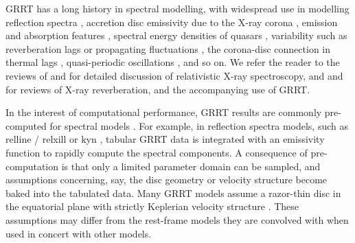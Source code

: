 \documentclass[fleqn,usenatbib]{mnras}
\newcommand{\software}[1]{{\sc #1}}
\begin{document}
GRRT has a long history in spectral modelling, with widespread use in modelling
reflection spectra \citep{fabian_x-ray_1989}, accretion disc emissivity
due to the X-ray corona \citep[e.g.][]{wilkins_understanding_2012,
wilkins_towards_2016}, emission and absorption features
\citep[e.g.][]{ruszkowski_absorption_2002}, spectral energy densities of quasars
\citep[e.g.][]{hagen_estimating_2023}, variability such as reverberation lags or
propagating fluctuations
\citep[e.g.][]{ingram_public_2019}, the corona-disc connection in thermal lags
\citep[e.g.][]{kammoun_hard_2019}, quasi-periodic oscillations \citep[QPOs,
e.g.][]{tsang_iron_2013}, and so on.  We refer the reader to the reviews of
\citet{reynolds_iron_lines_2003} and \citet{reynolds_observational_2021} for
detailed discussion of relativistic X-ray spectroscopy, and
\citet{uttley_x-ray_2014} and \citet{cackett_reverberation_2021} for reviews of
X-ray reverberation, and the accompanying use of GRRT.

In the interest of computational performance, GRRT results are commonly
pre-computed for spectral models \citep{laor_line_1991}. For example, in
reflection spectra models, such as \software{relline} / \software{relxill}
\citep{dauser_broad_2010, dauser_relativistic_2016} or \software{kyn}
\citep{dovciak_extended_2004}, tabular GRRT data is integrated with an emissivity function to rapidly
compute the spectral components. A consequence of pre-computation is that only a
limited parameter domain can be sampled, and assumptions concerning, say, the
disc geometry or velocity structure become baked into the tabulated data. Many
GRRT models assume a razor-thin disc in the equatorial plane with strictly
Keplerian velocity structure \citep[e.g.][]{dovciak_extended_2004,
beckwith_iron_2004, brenneman_constraining_2006, dauser_broad_2010}. These
assumptions may differ from the rest-frame models they are convolved with when
used in concert with other models.

\end{document}
